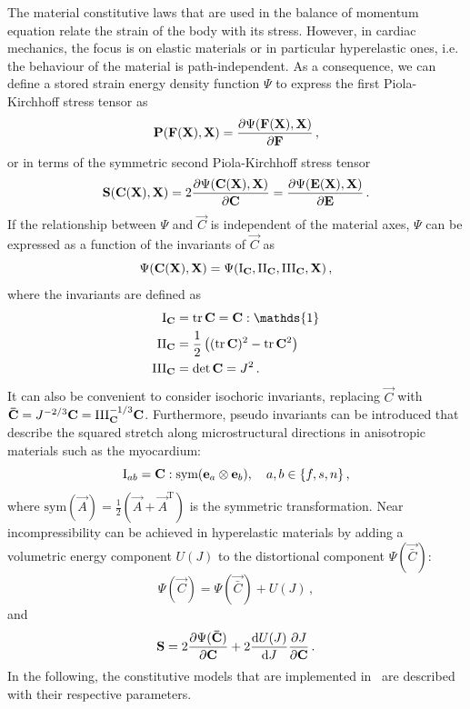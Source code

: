 The material constitutive laws that are used in the balance of momentum equation relate the strain of the body with its stress.
However, in cardiac mechanics, the focus is on elastic materials or in particular hyperelastic ones, i.e. the behaviour of the material is path-independent.
As a consequence, we can define a stored strain energy density function $\Psi$ to express the first Piola-Kirchhoff stress tensor as 
\begin{equation}
    \vec P (\vec F (\vec X), \vec X) = \pdv{\Psi (\vec F (\vec X), \vec X)}{\vec F} \,,
\end{equation}
or in terms of the symmetric second Piola-Kirchhoff stress tensor 
\begin{equation}
    \vec S (\vec C (\vec X), \vec X) = 2 \pdv{\Psi(\vec C (\vec X), \vec X)}{\vec C} = \pdv{\Psi(\vec E (\vec X), \vec X)}{\vec E} \,.
\end{equation}
If the relationship between $\Psi$ and $\vec C$ is independent of the material axes, $\Psi$ can be expressed as a function of the invariants of $\vec C$ as 
\begin{equation}
    \Psi(\vec C (\vec X), \vec X) = \Psi(\I{C},\II{C},\III{C}, \vec X) \,,
\end{equation}
where the invariants are defined as 
\begin{align}
    \I{C} &= \tr\vec C = \vec C : \mathds{1} \\
    \II{C} &= \frac{1}{2} \left( (\tr \vec C)^2 - \tr \vec C^2 \right) \\
    \III{C} &= \det\vec C = J^2 \,.
\end{align}
It can also be convenient to consider isochoric invariants, replacing $\vec C$ with $\vec{\bar{C}} = J^{-2/3} \vec C = \III{C}^{-1/3} \vec C$.
Furthermore, pseudo invariants can be introduced that describe the squared stretch along microstructural directions in anisotropic materials such as the myocardium:
\begin{equation}
    \mathrm{I}_{ab} = \vec C : \text{sym}(\vec e_a \otimes \vec e_b) \qc a,b \in \{f,s,n\} \,,
\end{equation}
where $\text{sym}(\vec A) = \frac{1}{2} (\vec A + \vec A^\mathrm{T})$ is the symmetric transformation.
Near incompressibility can be achieved in hyperelastic materials by adding a volumetric energy component $U(J)$ to the distortional component $\Psi (\vec{\bar{C}} )$:
\begin{equation}
    \Psi(\vec C) = \Psi (\vec{\bar{C}} ) + U(J) \,,
\end{equation}
and 
\begin{equation}
    \vec S = 2 \pdv{\Psi (\vec{\bar{C}} )}{\vec C} + 2 \dv{U(J)}{J}\pdv{J}{\vec C}  \,.
\end{equation}
In the following, the constitutive models that are implemented in \CM~are described with their respective parameters.

